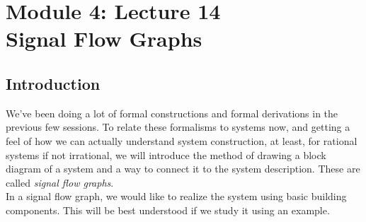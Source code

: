 \section{Module 4: Lecture 14\\Signal Flow Graphs}


\subsection{Introduction}
We've been doing a lot of formal constructions and formal derivations in the previous few sessions. To relate these formalisms to systems now, and getting a feel of how we can actually understand system construction, at least, for rational systems if not irrational, we will introduce the method of drawing a block diagram of a system and a way to connect it to the system description. These are called \textit{signal flow graphs}.\\
In a signal flow graph, we would like to realize the system using basic building components. This will be best understood if we study it using an example.
